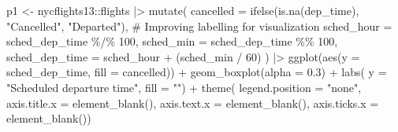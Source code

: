 \documentclass[
  letterpaper,
  DIV=11,
  numbers=noendperiod]{scrreprt}
\newenvironment{Shaded}{\begin{snugshade}}{\end{snugshade}}
\newcommand{\AttributeTok}[1]{\textcolor[rgb]{0.40,0.45,0.13}{#1}}
\newcommand{\CommentTok}[1]{\textcolor[rgb]{0.37,0.37,0.37}{#1}}
\newcommand{\DecValTok}[1]{\textcolor[rgb]{0.68,0.00,0.00}{#1}}
\newcommand{\FloatTok}[1]{\textcolor[rgb]{0.68,0.00,0.00}{#1}}
\newcommand{\FunctionTok}[1]{\textcolor[rgb]{0.28,0.35,0.67}{#1}}
\newcommand{\NormalTok}[1]{\textcolor[rgb]{0.00,0.23,0.31}{#1}}
\newcommand{\OtherTok}[1]{\textcolor[rgb]{0.00,0.23,0.31}{#1}}
\newcommand{\SpecialCharTok}[1]{\textcolor[rgb]{0.37,0.37,0.37}{#1}}
\newcommand{\StringTok}[1]{\textcolor[rgb]{0.13,0.47,0.30}{#1}}
\begin{document}
\begin{Shaded}
\begin{Highlighting}[]
\NormalTok{p1 }\OtherTok{\textless{}{-}}\NormalTok{ nycflights13}\SpecialCharTok{::}\NormalTok{flights }\SpecialCharTok{|\textgreater{}} 
  \FunctionTok{mutate}\NormalTok{(}
    \AttributeTok{cancelled =} \FunctionTok{ifelse}\NormalTok{(}\FunctionTok{is.na}\NormalTok{(dep\_time), }\StringTok{"Cancelled"}\NormalTok{, }\StringTok{"Departed"}\NormalTok{), }\CommentTok{\# Improving labelling for visualization}
    \AttributeTok{sched\_hour =}\NormalTok{ sched\_dep\_time }\SpecialCharTok{\%/\%} \DecValTok{100}\NormalTok{,}
    \AttributeTok{sched\_min =}\NormalTok{ sched\_dep\_time }\SpecialCharTok{\%\%} \DecValTok{100}\NormalTok{,}
    \AttributeTok{sched\_dep\_time =}\NormalTok{ sched\_hour }\SpecialCharTok{+}\NormalTok{ (sched\_min }\SpecialCharTok{/} \DecValTok{60}\NormalTok{)}
\NormalTok{  ) }\SpecialCharTok{|\textgreater{}} 
  \FunctionTok{ggplot}\NormalTok{(}\FunctionTok{aes}\NormalTok{(}\AttributeTok{y =}\NormalTok{ sched\_dep\_time, }\AttributeTok{fill =}\NormalTok{ cancelled)) }\SpecialCharTok{+} 
  \FunctionTok{geom\_boxplot}\NormalTok{(}\AttributeTok{alpha =} \FloatTok{0.3}\NormalTok{) }\SpecialCharTok{+} 
  \FunctionTok{labs}\NormalTok{(}
    \AttributeTok{y =} \StringTok{"Scheduled departure time"}\NormalTok{,}
    \AttributeTok{fill =} \StringTok{""}\NormalTok{) }\SpecialCharTok{+}
  \FunctionTok{theme}\NormalTok{(}
    \AttributeTok{legend.position =} \StringTok{"none"}\NormalTok{,}
    \AttributeTok{axis.title.x =} \FunctionTok{element\_blank}\NormalTok{(),}
    \AttributeTok{axis.text.x =} \FunctionTok{element\_blank}\NormalTok{(),}
    \AttributeTok{axis.ticks.x =} \FunctionTok{element\_blank}\NormalTok{())}


\end{Highlighting}
\end{Shaded}
\end{document}
